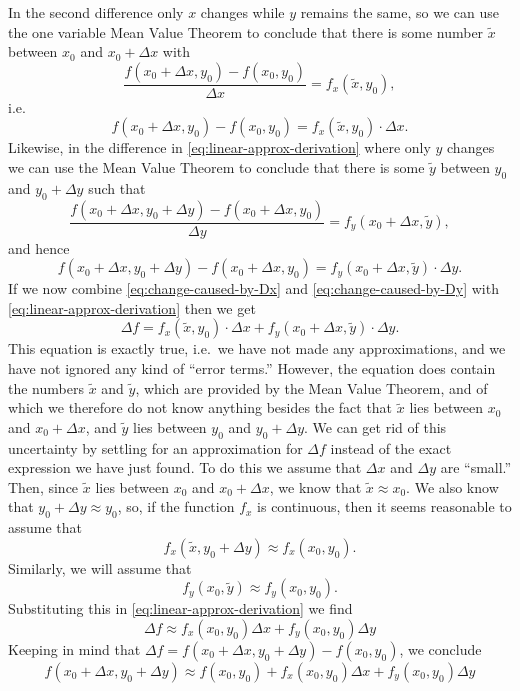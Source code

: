 In the second difference only $x$ changes while $y$ remains the same, so we can
use the one variable Mean Value Theorem to conclude that there is some number
$\tilde x$ between $x_0$ and $x_0+\Delta x$ with
\[
\frac{f(x_0+\Delta x, y_0) - f(x_0, y_0)}{\Delta x} = f_x(\tilde x, y_0),
\]
i.e.
\begin{equation}
  f(x_0+\Delta x, y_0) - f(x_0, y_0) = f_x(\tilde x, y_0) \cdot \Delta x.
  \label{eq:change-caused-by-Dx}
\end{equation}
Likewise, in the difference in \eqref{eq:linear-approx-derivation} where only
$y$ changes we can use the Mean Value Theorem to conclude that there is some
$\tilde y$ between $y_0$ and $y_0+\Delta y$ such that
\[
\frac{f(x_0+\Delta x, y_0+\Delta y) - f(x_0+\Delta x, y_0)}{\Delta y} =
f_y(x_0+\Delta x, \tilde y),
\]
and hence
\begin{equation}
  f(x_0+\Delta x, y_0+\Delta y) - f(x_0+\Delta x, y_0) 
  = f_y(x_0+\Delta x, \tilde y) \cdot \Delta y.
  \label{eq:change-caused-by-Dy}
\end{equation}
If we now combine \eqref{eq:change-caused-by-Dx} and
\eqref{eq:change-caused-by-Dy} with \eqref{eq:linear-approx-derivation} then we
get
\[
\Delta f = f_x(\tilde x, y_0)\cdot\Delta x + f_y(x_0+\Delta x,\tilde
y)\cdot\Delta y.
\]
This equation is exactly true, i.e.~we have not made any approximations, and we
have not ignored any kind of ``error terms.''  However, the equation does
contain the numbers $\tilde x$ and $\tilde y$, which are provided by the Mean
Value Theorem, and of which we therefore do not know anything besides the fact
that $\tilde{x}$ lies between $x_0$ and $x_0 + \Delta x$, and $\tilde{y}$ lies
between $y_0$ and $y_0+\Delta y$.  We can get rid of this uncertainty by
settling for an approximation for $\Delta f$ instead of the exact expression we
have just found.  To do this we assume that $\Delta x$ and $\Delta y$ are
``small.''  Then, since $\tilde{x}$ lies between $x_0$ and $x_0+\Delta x$, we
know that $\tilde x\approx x_0$.  We also know that $y_0+\Delta y \approx y_0$,
so, if the function $f_x$ is continuous, then it seems reasonable to assume that
\begin{equation}
  f_x(\tilde{x}, y_0+\Delta y) \approx f_x(x_0, y_0).
  \label{eq:fx-continuous}
\end{equation}
Similarly, we will assume that
\begin{equation}
  f_y(x_0, \tilde{y}) \approx f_y(x_0, y_0).
  \label{eq:fy-continuous}
\end{equation}
Substituting this in \eqref{eq:linear-approx-derivation} we find
\begin{equation}
  \Delta f \approx f_x(x_0, y_0)\Delta x + f_y(x_0, y_0) \Delta y
  \label{eq:linear-approximation-no-error-Deltaf}
\end{equation}
Keeping in mind that $\Delta f = f(x_0+ \Delta x, y_0+\Delta y)-f(x_0,y_0)$, we
conclude
\begin{equation}
  \label{eq:linear-approximation-no-error}
  f(x_0+\Delta x, y_0+\Delta y)
  \approx
  f(x_0, y_0)+f_x(x_0, y_0)\Delta x + f_y(x_0, y_0) \Delta y
\end{equation}

